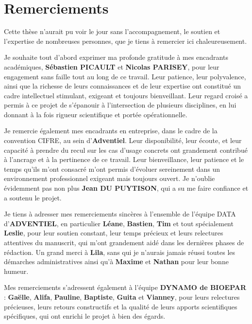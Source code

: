 \chapter*{Remerciements}
Cette thèse n’aurait pu voir le jour sans l’accompagnement, le soutien et l’expertise de nombreuses personnes, que je tiens à remercier ici chaleureusement. \vspace{0.5\baselineskip}

Je souhaite tout d’abord exprimer ma profonde gratitude à mes encadrants académiques, \textbf{Sébastien PICAULT} et \textbf{Nicolas PARISEY}, pour leur engagement sans faille tout au long de ce travail. Leur patience, leur polyvalence, ainsi que la richesse de leurs connaissances et de leur expertise ont constitué un cadre intellectuel stimulant, exigeant et toujours bienveillant. Leur regard croisé a permis à ce projet de s’épanouir à l’intersection de plusieurs disciplines, en lui donnant à la fois rigueur scientifique et portée opérationnelle. \vspace{0.5\baselineskip}

Je remercie également mes encadrants en entreprise, dans le cadre de la convention CIFRE, au sein d’\textbf{Adventiel}. Leur disponibilité, leur écoute, et leur capacité à prendre du recul sur les cas d’usage concrets ont grandement contribué à l’ancrage et à la pertinence de ce travail. Leur bienveillance, leur patience et le temps qu’ils m’ont consacré m’ont permis d’évoluer sereinement dans un environnement professionnel exigeant mais toujours ouvert. Je n'oublie évidemment pas non plus \textbf{Jean DU PUYTISON}, qui a su me faire confiance et a soutenu le projet.\vspace{0.5\baselineskip}

Je tiens à adresser mes remerciements sincères à l’ensemble de l’équipe DATA  d’\textbf{ADVENTIEL}, en particulier \textbf{Léane}, \textbf{Bastien}, \textbf{Tim} et tout spécialement \textbf{Leslie}, pour leur soutien constant, leur temps précieux et leurs relectures attentives du manuscrit, qui m’ont grandement aidé dans les dernières phases de rédaction. Un grand merci à \textbf{Lila}, sans qui je n'aurais jamais réussi toutes les démarches administratives ainsi qu'à \textbf{Maxime} et \textbf{Nathan} pour leur bonne humeur. \vspace{0.5\baselineskip}

Mes remerciements s’adressent également à l’équipe \textbf{DYNAMO de BIOEPAR} : \textbf{Gaëlle}, \textbf{Alifa}, \textbf{Pauline}, \textbf{Baptiste}, \textbf{Guita} et \textbf{Vianney}, pour leurs relectures précieuses, leurs retours constructifs et la qualité de leurs apports scientifiques spécifiques, qui ont enrichi le projet à bien des égards. \vspace{0.5\baselineskip}

